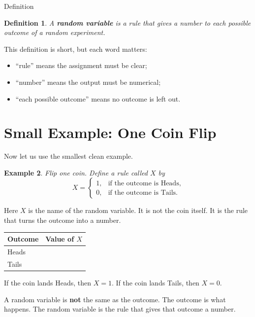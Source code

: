\documentclass[11pt,a4paper]{article}
\newtheorem{definition}{Definition}[section]
\newtheorem{example}[definition]{Example}
\begin{document}
\begin{mathblock}{Definition}
\begin{definition}
A \textbf{random variable} is a rule that gives a number to each possible outcome of a random experiment.
\end{definition}
\end{mathblock}

This definition is short, but each word matters:

\begin{itemize}
  \item ``rule'' means the assignment must be clear;
  \item ``number'' means the output must be numerical;
  \item ``each possible outcome'' means no outcome is left out.
\end{itemize}

\section{Small Example: One Coin Flip}

Now let us use the smallest clean example.

\begin{example}
Flip one coin.
Define a rule called \(X\) by
\[
X=
\begin{cases}
1, & \text{if the outcome is Heads},\\
0, & \text{if the outcome is Tails}.
\end{cases}
\]
\end{example}

Here \(X\) is the name of the random variable.
It is not the coin itself.
It is the rule that turns the outcome into a number.

\begin{center}
\begin{tabular}{>{\raggedright\arraybackslash}p{4cm} >{\centering\arraybackslash}p{4cm}}
\toprule
Outcome & Value of \(X\) \\
\midrule
Heads & 1 \\
Tails & 0 \\
\bottomrule
\end{tabular}
\end{center}

If the coin lands Heads, then \(X=1\).
If the coin lands Tails, then \(X=0\).

\begin{warningblock}
A random variable is \textbf{not} the same as the outcome.
The outcome is what happens.
The random variable is the rule that gives that outcome a number.
\end{warningblock}
\end{document}
